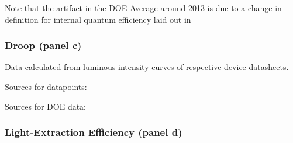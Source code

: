 \documentclass{article}
\begin{document}
\cite{doe_ssl_multiyear_2006}\cite{doe_ssl_multiyear_2007}\cite{doe_ssl_multiyear_2008}\cite{doe_ssl_multiyear_2009}\cite{doe_ssl_multiyear_2010}\cite{doe_ssl_multiyear_2011}\cite{doe_ssl_multiyear_2012}\cite{doe_ssl_multiyear_2013}\cite{doe_ssl_multiyear_2014}\cite{doe_ssl_rnd_2015}\cite{doe_ssl_rnd_2016}

Note that the artifact in the DOE Average around 2013 is due to a change in definition for internal quantum efficiency laid out in \cite{doe_ssl_multiyear_2013}

\subsubsection{Droop (panel c)}

Data calculated from luminous intensity curves of respective device datasheets.

Sources for datapoints: \cite{datasheet_osram_topled}\cite{osram2008data}\cite{osram2008gdplus}\cite{osram2018csp}\cite{datasheet_lumileds_lux1}\cite{lumi2008data}\cite{lumi2016data_1}\cite{lumi2016data_2}\cite{samsung2018data}

Sources for DOE data: \cite{doe_ssl_multiyear_2010}\cite{doe_ssl_multiyear_2011}\cite{doe_ssl_multiyear_2012}\cite{doe_ssl_multiyear_2013}\cite{doe_ssl_multiyear_2014}\cite{doe_ssl_rnd_2015}\cite{doe_ssl_rnd_2016}

\subsubsection{Light-Extraction Efficiency (panel d)}

\cite{lee2005analysis}\cite{krames2007status}\cite{Jang2004}\cite{Horng2013}\cite{Liao2010}\cite{HungWenHuang2005}\cite{Leem2007}\cite{Huang2008}\cite{Wang2009}\cite{Huh2003}\cite{Horng2008}\cite{Gao2008}\cite{Chang2003}\cite{Zhou2012}\cite{ChunJuTun2006}\cite{Hua2009}\cite{Matioli2010} \newline
\cite{lee2005analysis}\cite{Zhu2015}\cite{Ding2015}\cite{Taki2019}\cite{Shchekin2006}\cite{Hu2016}\cite{Horng2010}\cite{Lin2016}\cite{Yue2018}\cite{Zhao2012}\cite{Zhu2015}\cite{Ding2015}\cite{wierer2001high}\cite{Steigerwald2002}\cite{DaeSeobHan2006}\cite{Wang2006}\cite{Lee2007}\cite{Shen2007}\cite{Huang2006}\cite{Zhmakin2011}

\newpage


\end{document}
